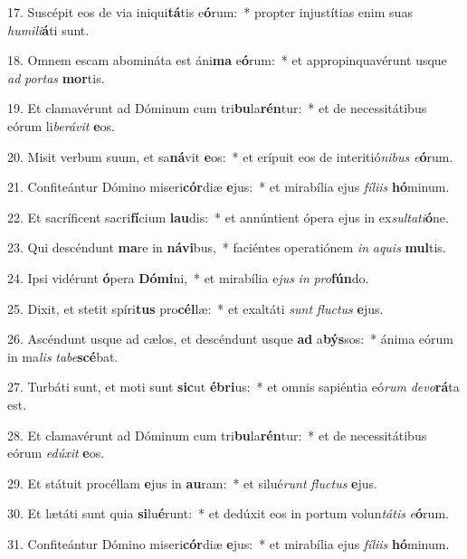 17. Suscépit eos de via iniqui\textbf{tá}tis e\textbf{ó}rum:~*  propter injustítias enim suas \textit{hu}\textit{mi}\textit{li}\textbf{á}ti sunt.\

18. Omnem escam abomináta est áni\textbf{ma} e\textbf{ó}rum:~*  et appropinquavérunt usque \textit{ad} \textit{por}\textit{tas} \textbf{mor}tis.\

19. Et clamavérunt ad Dóminum cum tri\textbf{bu}la\textbf{rén}tur:~*  et de necessitátibus eórum li\textit{be}\textit{rá}\textit{vit} \textbf{e}os.\

20. Misit verbum suum, et sa\textbf{ná}vit \textbf{e}os:~*  et erípuit eos de interitió\textit{ni}\textit{bus} \textit{e}\textbf{ó}rum.\

21. Confiteántur Dómino miseri\textbf{cór}diæ \textbf{e}jus:~*  et mirabília ejus \textit{fí}\textit{li}\textit{is} \textbf{hó}minum.\

22. Et sacríficent sacri\textbf{fí}cium \textbf{lau}dis:~*  et annúntient ópera ejus in ex\textit{sul}\textit{ta}\textit{ti}\textbf{ó}ne.\

23. Qui descéndunt \textbf{ma}re in \textbf{ná}\textbf{vi}bus,~*  faciéntes operatiónem \textit{in} \textit{a}\textit{quis} \textbf{mul}tis.\

24. Ipsi vidérunt \textbf{ó}pera \textbf{Dó}\textbf{mi}ni,~*  et mirabília e\textit{jus} \textit{in} \textit{pro}\textbf{fún}do.\

25. Dixit, et stetit spíri\textbf{tus} pro\textbf{cél}læ:~*  et exaltáti \textit{sunt} \textit{fluc}\textit{tus} \textbf{e}jus.\

26. Ascéndunt usque ad cælos, et descéndunt usque \textbf{ad} a\textbf{býs}sos:~*  ánima eórum in ma\textit{lis} \textit{ta}\textit{be}\textbf{scé}bat.\

27. Turbáti sunt, et moti sunt \textbf{sic}ut \textbf{é}\textbf{bri}us:~*  et omnis sapiéntia eó\textit{rum} \textit{de}\textit{vo}\textbf{rá}ta est.\

28. Et clamavérunt ad Dóminum cum tri\textbf{bu}la\textbf{rén}tur:~*  et de necessitátibus eórum \textit{e}\textit{dú}\textit{xit} \textbf{e}os.\

29. Et státuit procéllam \textbf{e}jus in \textbf{au}ram:~*  et silué\textit{runt} \textit{fluc}\textit{tus} \textbf{e}jus.\

30. Et lætáti sunt quia \textbf{si}lu\textbf{é}runt:~*  et dedúxit eos in portum volun\textit{tá}\textit{tis} \textit{e}\textbf{ó}rum.\

31. Confiteántur Dómino miseri\textbf{cór}diæ \textbf{e}jus:~*  et mirabília ejus \textit{fí}\textit{li}\textit{is} \textbf{hó}minum.\

